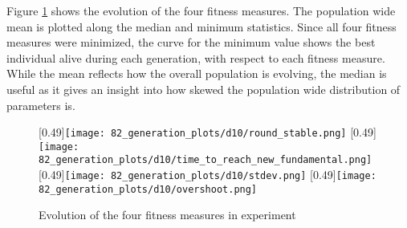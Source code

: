 Figure \ref{fig:d10_evolution_fitness} shows the evolution of the four fitness measures. The population wide mean is plotted along the median and minimum statistics. Since all four fitness measures were minimized, the curve for the minimum value shows the best individual alive during each generation, with respect to each fitness measure. While the mean reflects how the overall population is evolving,  the median is useful as it gives an insight into how skewed the population wide distribution of parameters is. 
\begin{figure}
	\centering
	[0.49\linewidth]{\texttt{[image: 82\_generation\_plots/d10/round\_stable.png]}}
	[0.49\linewidth]{\texttt{[image: 82\_generation\_plots/d10/time\_to\_reach\_new\_fundamental.png]}}
	[0.49\linewidth]{\texttt{[image: 82\_generation\_plots/d10/stdev.png]}}
	[0.49\linewidth]{\texttt{[image: 82\_generation\_plots/d10/overshoot.png]}}
	\caption{Evolution of the four fitness measures in experiment \dten}
	\label{fig:d10_evolution_fitness}
\end{figure}



